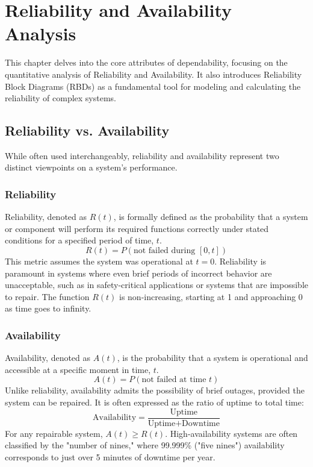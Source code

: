 \chapter{Reliability and Availability Analysis}

This chapter delves into the core attributes of dependability, focusing on the quantitative analysis of Reliability and Availability. It also introduces Reliability Block Diagrams (RBDs) as a fundamental tool for modeling and calculating the reliability of complex systems.

\section{Reliability vs. Availability}

While often used interchangeably, reliability and availability represent two distinct viewpoints on a system's performance.

\subsection{Reliability}
Reliability, denoted as $R(t)$, is formally defined as the probability that a system or component will perform its required functions correctly under stated conditions for a specified period of time, $t$.
\begin{equation}
    R(t) = P(\text{not failed during } [0, t])
\end{equation}
This metric assumes the system was operational at $t=0$. Reliability is paramount in systems where even brief periods of incorrect behavior are unacceptable, such as in safety-critical applications or systems that are impossible to repair. The function $R(t)$ is non-increasing, starting at 1 and approaching 0 as time goes to infinity.

\subsection{Availability}
Availability, denoted as $A(t)$, is the probability that a system is operational and accessible at a specific moment in time, $t$.
\begin{equation}
    A(t) = P(\text{not failed at time } t)
\end{equation}
Unlike reliability, availability admits the possibility of brief outages, provided the system can be repaired. It is often expressed as the ratio of uptime to total time:
\begin{equation}
    \text{Availability} = \frac{\text{Uptime}}{\text{Uptime} + \text{Downtime}}
\end{equation}
For any repairable system, $A(t) \geq R(t)$. High-availability systems are often classified by the "number of nines," where 99.999\% ("five nines") availability corresponds to just over 5 minutes of downtime per year.

